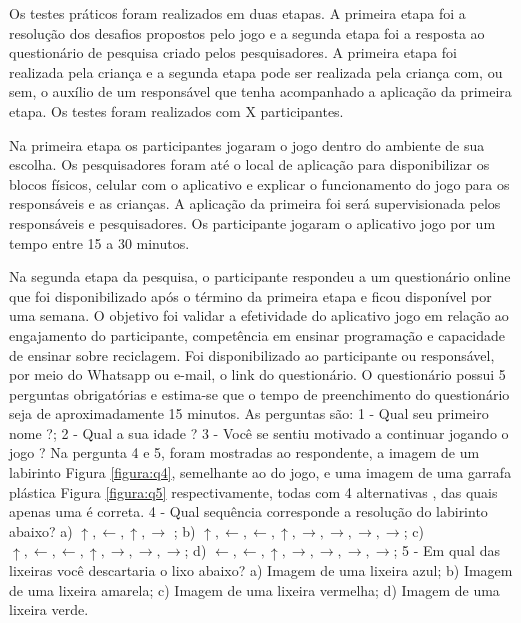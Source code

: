 Os testes práticos foram realizados em duas etapas. A primeira etapa foi a resolução dos desafios propostos pelo jogo e a segunda etapa foi a resposta ao questionário de pesquisa criado pelos pesquisadores. A primeira etapa foi realizada pela criança e a segunda etapa pode ser realizada pela criança com, ou sem, o auxílio de um responsável que tenha acompanhado a aplicação da primeira etapa. Os testes foram realizados com X participantes.

Na primeira etapa os participantes jogaram o jogo dentro do ambiente de sua escolha. Os pesquisadores foram até o local de aplicação para disponibilizar os blocos físicos, celular com o aplicativo e explicar o
funcionamento do jogo para os responsáveis e as crianças. A aplicação da primeira foi será supervisionada pelos responsáveis e pesquisadores. Os participante jogaram o  aplicativo jogo por um tempo entre 15 a 30 minutos.

Na segunda etapa da pesquisa, o participante respondeu  a um questionário online que foi disponibilizado após o término da primeira etapa e ficou disponível por uma semana. O objetivo foi  validar a efetividade do aplicativo jogo em relação ao engajamento do participante, competência em ensinar programação e
capacidade de ensinar sobre reciclagem. Foi disponibilizado ao participante ou responsável, por meio do Whatsapp ou e-mail, o link do questionário. O questionário possui 5 perguntas obrigatórias e estima-se que o tempo de preenchimento do questionário seja de aproximadamente 15 minutos. As perguntas são: 1 - Qual seu primeiro nome ?; 2 - Qual a sua idade ? 3 - Você se sentiu motivado a continuar jogando o jogo ? Na pergunta 4 e 5, foram mostradas ao respondente, a imagem de um labirinto Figura \ref{figura:q4}, semelhante ao do jogo, e uma imagem de uma garrafa plástica Figura \ref{figura:q5} respectivamente, todas com 4 alternativas , das quais apenas uma é correta. 4 - Qual sequência corresponde a resolução do labirinto abaixo? a) $\uparrow,  \leftarrow, \uparrow, \rightarrow$ ; b) $\uparrow, \leftarrow, \leftarrow, \uparrow, \rightarrow, \rightarrow, \rightarrow, \rightarrow$; c) $\uparrow, \leftarrow, \leftarrow, \uparrow, \rightarrow, \rightarrow, \rightarrow$; d) $\leftarrow, \leftarrow, \uparrow, \rightarrow, \rightarrow, \rightarrow, \rightarrow$; 5 - Em qual das lixeiras você descartaria o lixo abaixo? a) Imagem de uma lixeira azul; b) Imagem de uma lixeira amarela; c) Imagem de uma lixeira vermelha; d) Imagem de uma lixeira verde.

